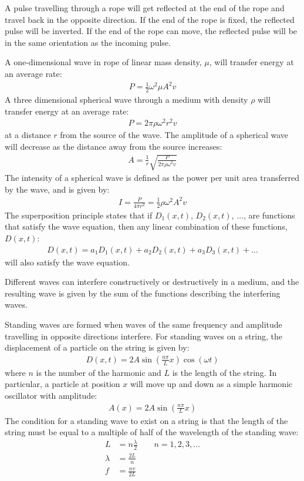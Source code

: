 \begin{chapterSummary}
A pulse travelling through a rope will get reflected at the end of the rope and travel back in the opposite direction. If the end of the rope is fixed, the reflected pulse will be inverted. If the end of the rope can move, the reflected pulse will be in the same orientation as the incoming pulse.

A one-dimensional wave in rope of linear mass density, $\mu$, will transfer energy at an average rate:
\begin{align*}
P = \frac{1}{2}\omega^2\mu A^2 v 
\end{align*}
A three dimensional spherical wave through a medium with density $\rho$ will transfer energy at an average rate:
\begin{align*}
P = 2\pi\rho\omega^2r^2 v
\end{align*}
at a distance $r$ from the source of the wave. The amplitude of a spherical wave will decrease as the distance away from the source increases:
\begin{align*}
A =\frac{1}{r}\sqrt{\frac{P}{2\pi\rho \omega^2 v}}
\end{align*}
The intensity of a spherical wave is defined as the power per unit area transferred by the wave, and is given by:
\begin{align*}
I=\frac{P}{4\pi r^2}=\frac{1}{2}\rho\omega^2A^2v
\end{align*}
The superposition principle states that if $D_1(x,t)$, $D_2(x,t)$, $\dots$, are functions that satisfy the wave equation, then any linear combination of these functions, $D(x,t)$:
\begin{align*}
D(x,t) = a_1D_1(x,t)+a_2D_2(x,t)+a_3D_3(x,t)+\dots
\end{align*}
will also satisfy the wave equation. 

Different waves can interfere constructively or destructively in a medium, and the resulting wave is given by the sum of the functions describing the interfering waves. 

Standing waves are formed when waves of the same frequency and amplitude travelling in opposite directions interfere. For standing waves on a string, the displacement of a particle on the string is given by:
\begin{align*}
D(x,t)=2A\sin\left(\frac{n\pi}{L}x\right)\cos(\omega t)
\end{align*}
where $n$ is the number of the harmonic and $L$ is the length of the string. In particular, a particle at position $x$ will move up and down as a simple harmonic oscillator with amplitude:
\begin{align*}
A(x) = 2A\sin\left(\frac{n\pi}{L}x\right)
\end{align*}
The condition for a standing wave to exist on a string is that the length of the string must be equal to a multiple of half of the wavelength of the standing wave:
\begin{align*}
L &= n\frac{\lambda}{2}\quad\quad n=1,2,3,\dots\\
\lambda &= \frac{2L}{n}\\
f &= \frac{nv}{2L}
\end{align*}


\end{chapterSummary}

